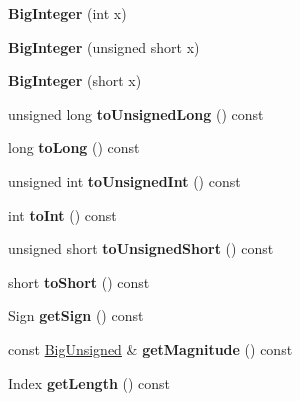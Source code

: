 \begin{DoxyCompactItemize}
{\bfseries Big\+Integer} (int x)
\item 
\mbox{\label{class_big_integer_aca6e7ecd7af7257a62e6e5a7c2c3cf4f}} 
{\bfseries Big\+Integer} (unsigned short x)
\item 
\mbox{\label{class_big_integer_a6199db3b49a628bfc191350a528e8f9a}} 
{\bfseries Big\+Integer} (short x)
\item 
\mbox{\label{class_big_integer_a3db2371da6627f03c512f4aec86ba4ee}} 
unsigned long {\bfseries to\+Unsigned\+Long} () const
\item 
\mbox{\label{class_big_integer_a26ccf6204204f23778550550a103c8fb}} 
long {\bfseries to\+Long} () const
\item 
\mbox{\label{class_big_integer_ad5c13828d64c56dcfb3d60f6997e2d8e}} 
unsigned int {\bfseries to\+Unsigned\+Int} () const
\item 
\mbox{\label{class_big_integer_a5610ec6cd33c76f45264159075338142}} 
int {\bfseries to\+Int} () const
\item 
\mbox{\label{class_big_integer_a0e6fcde761a22cc25843bf8e5b268756}} 
unsigned short {\bfseries to\+Unsigned\+Short} () const
\item 
\mbox{\label{class_big_integer_acecb691ade1273cf99018fb316e460d3}} 
short {\bfseries to\+Short} () const
\item 
\mbox{\label{class_big_integer_ac23826926ade0a83fb15fe4db7d4f95b}} 
Sign {\bfseries get\+Sign} () const
\item 
\mbox{\label{class_big_integer_a2b17965bdeee75886f36627187b9f33c}} 
const \mbox{\hyperlink{class_big_unsigned}{Big\+Unsigned}} \& {\bfseries get\+Magnitude} () const
\item 
\mbox{\label{class_big_integer_a31bc02d73a2cd2543eb0766d438be873}} 
Index {\bfseries get\+Length} () const
\item 
\mbox{\label{class_big_integer_a4b2701e018df181d4a29238e99c8eee5}} 

\end{DoxyCompactItemize}
